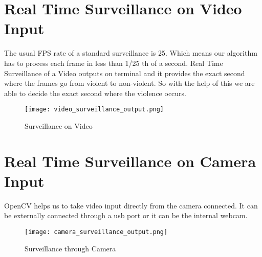 \section{Real Time Surveillance on Video Input}
The usual FPS rate of a standard surveillance is 25. Which means our algorithm has to process each frame in less than 1/25 th of a second. Real Time Surveillance of a Video outputs on terminal and it provides the exact second where the frames go from violent to non-violent. So with the help of this we are able to decide the exact second where the violence occurs. 
\begin{figure}[H]
\centering
\texttt{[image: video\_surveillance\_output.png]}
\caption{Surveillance on Video}
\end{figure}
\section{Real Time Surveillance on Camera Input}
OpenCV helps us to take video input directly from the camera connected. It can be externally connected through a usb port or it can be the internal webcam.
\begin{figure}[H]
\centering
\texttt{[image: camera\_surveillance\_output.png]}
\caption{Surveillance through Camera}
\end{figure}
